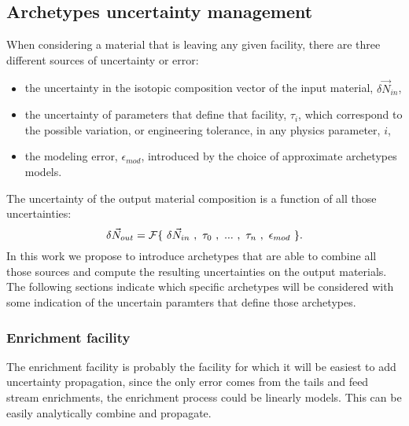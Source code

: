 \documentclass[dvips,12pt]{article}
\begin{document}
\subsection{Archetypes uncertainty management}
When considering a material that is leaving any 
given facility,
 there are three
different sources of uncertainty or error:
\begin{itemize}
\item the uncertainty in the isotopic composition vector
  of the input material,
  $\delta\vec{N}_{in}$,
\item the uncertainty of parameters that define that
  facility, $\tau_{i}$, 
  which correspond to the possible
  variation, or engineering tolerance, in any physics parameter, $i$,
\item the modeling error, $\epsilon_{mod}$, introduced by
  the choice of approximate archetypes models.
\end{itemize}
The uncertainty of the output material composition is a
function of all those uncertainties:
\begin{equation}
\delta \vec{N}_{out} = {\cal F}\{~\delta\vec{N}_{in}~,~\tau_0~,~...~,~\tau_n~,~\epsilon_{mod}~\}.
\end{equation}
In this work we propose to introduce archetypes 
that are able to combine 
all those sources and compute the resulting
uncertainties on the output materials.  The
following sections indicate which specific archetypes
will be considered with some indication of the uncertain
paramters that define those archetypes.

\subsubsection{Enrichment facility}
The enrichment facility is probably the 
facility for which it will be easiest to add uncertainty propagation,
since the only error comes from
the tails and feed stream enrichments, the
enrichment process could be linearly models. This
can be easily analytically combine and propagate.


\end{document}
